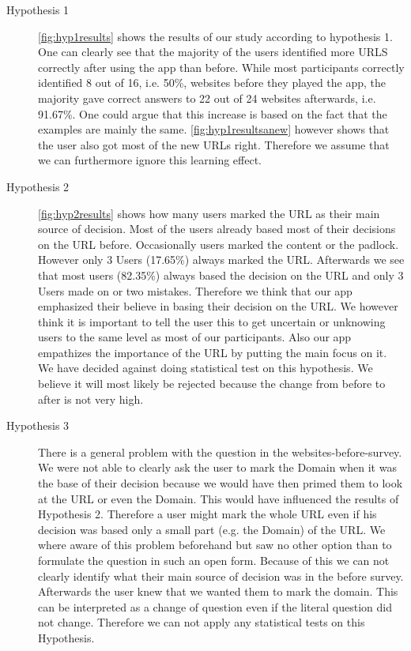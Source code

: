 \begin{description}
\item[Hypothesis 1]
\autoref{fig:hyp1results} shows the results of our study according to hypothesis 1. One can clearly see that the majority of the users identified more URLS correctly after using the app than before. While most participants correctly identified 8 out of 16, i.e. 50\%, websites before they played the app, the majority gave correct answers to 22 out of 24 websites afterwards, i.e. 91.67\%. One could argue that this increase is based on the fact that the examples are mainly the same. \autoref{fig:hyp1resultsanew} however shows that the user also got most of the new URLs right. Therefore we assume that we can furthermore ignore this learning effect. 
\item[Hypothesis 2]
\autoref{fig:hyp2results} shows how many users marked the URL as their main source of decision.
Most of the users already based most of their decisions on the URL before.
Occasionally users marked the content or the padlock.
However only 3 Users (17.65\%) always marked the URL.
Afterwards we see that most users (82.35\%) always based the decision on the URL and only 3 Users made on or two mistakes.
Therefore we think that our app emphasized their believe in basing their decision on the URL.
We however think it is important to tell the user this to get uncertain or unknowing users to the same level as most of our participants.
Also our app empathizes the importance of the URL by putting the main focus on it.
We have decided against doing statistical test on this hypothesis.
We believe it will most likely be rejected because the change from before to after is not very high.
\item[Hypothesis 3]
There is a general problem with the question in the websites-before-survey.
We were not able to clearly ask the user to mark the Domain when it was the base of their decision because we would have then primed them to look at the URL or even the Domain.
This would have influenced the results of Hypothesis 2.
Therefore a user might mark the whole URL even if his decision was based only a small part (e.g. the Domain) of the URL.
We where aware of this problem beforehand but saw no other option than to formulate the question in such an open form.
Because of this we can not clearly identify what their main source of decision was in the before survey.
Afterwards the user knew that we wanted them to mark the domain.
This can be interpreted as a change of question even if the literal question did not change.
Therefore we can not apply any statistical tests on this Hypothesis.

\end{description}
